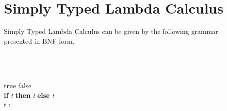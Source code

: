 \documentclass[a4paper,11pt]{article}
\begin{document}
\section{\bf{Simply Typed Lambda Calculus}}
Simply Typed Lambda Calculus can be given by the following grammar presented in BNF form. 
\begin{bnf*}
   \bnfsk {}  \\ 
  \bnfmore \bnfor {}  \\
  \bnfmore \bnfor {}  \\ 
  \bnfmore \bnfor true \bnfor false \\ 
  \bnfmore \bnfor \textbf{if} \textit{ t } \textbf{then} \textit{ t } \textbf{else} \textit{ t } \\ 
  \bnfmore \bnfor t : \tau \\ 
  \bnfprod{$\tau$} 
   \\ 
  \bnfmore \bnfor \bnfpn{$\tau \rightarrow \tau$} 
\end{bnf*}
\end{document}
